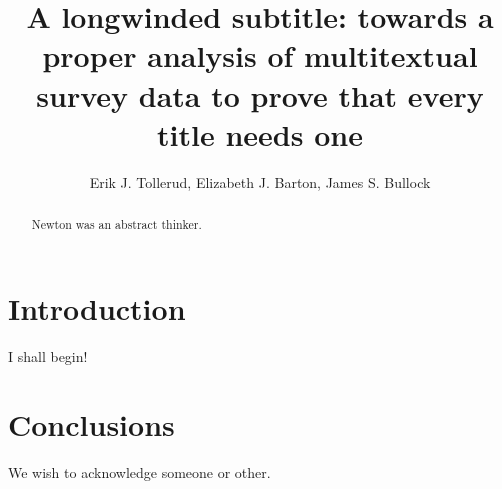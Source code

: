 \documentclass{emulateapj}
\begin{document}
\title{A longwinded subtitle: towards a proper analysis of multitextual survey data to prove that every title needs one}

\author{Erik J. Tollerud, Elizabeth J. Barton, James S. Bullock }

\begin{abstract}
Newton was an abstract thinker.

\end{abstract}

\section{Introduction}
\label{sec:intro}
I shall begin!\citep{NC}


\section{Conclusions}
\label{sec:conc}


We wish to acknowledge someone or other.


{}
 
\end{document}
